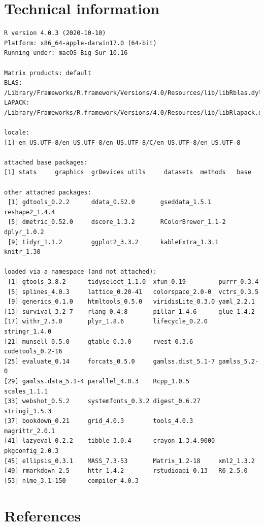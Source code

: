 \documentclass[
]{book}
\begin{document}
\hypertarget{ap:technical}{%
\chapter{Technical information}\label{ap:technical}}

\begin{verbatim}
R version 4.0.3 (2020-10-10)
Platform: x86_64-apple-darwin17.0 (64-bit)
Running under: macOS Big Sur 10.16

Matrix products: default
BLAS:   /Library/Frameworks/R.framework/Versions/4.0/Resources/lib/libRblas.dylib
LAPACK: /Library/Frameworks/R.framework/Versions/4.0/Resources/lib/libRlapack.dylib

locale:
[1] en_US.UTF-8/en_US.UTF-8/en_US.UTF-8/C/en_US.UTF-8/en_US.UTF-8

attached base packages:
[1] stats     graphics  grDevices utils     datasets  methods   base     

other attached packages:
 [1] gdtools_0.2.2      ddata_0.52.0       gseddata_1.5.1     reshape2_1.4.4    
 [5] dmetric_0.52.0     dscore_1.3.2       RColorBrewer_1.1-2 dplyr_1.0.2       
 [9] tidyr_1.1.2        ggplot2_3.3.2      kableExtra_1.3.1   knitr_1.30        

loaded via a namespace (and not attached):
 [1] gtools_3.8.2      tidyselect_1.1.0  xfun_0.19         purrr_0.3.4      
 [5] splines_4.0.3     lattice_0.20-41   colorspace_2.0-0  vctrs_0.3.5      
 [9] generics_0.1.0    htmltools_0.5.0   viridisLite_0.3.0 yaml_2.2.1       
[13] survival_3.2-7    rlang_0.4.8       pillar_1.4.6      glue_1.4.2       
[17] withr_2.3.0       plyr_1.8.6        lifecycle_0.2.0   stringr_1.4.0    
[21] munsell_0.5.0     gtable_0.3.0      rvest_0.3.6       codetools_0.2-16 
[25] evaluate_0.14     forcats_0.5.0     gamlss.dist_5.1-7 gamlss_5.2-0     
[29] gamlss.data_5.1-4 parallel_4.0.3    Rcpp_1.0.5        scales_1.1.1     
[33] webshot_0.5.2     systemfonts_0.3.2 digest_0.6.27     stringi_1.5.3    
[37] bookdown_0.21     grid_4.0.3        tools_4.0.3       magrittr_2.0.1   
[41] lazyeval_0.2.2    tibble_3.0.4      crayon_1.3.4.9000 pkgconfig_2.0.3  
[45] ellipsis_0.3.1    MASS_7.3-53       Matrix_1.2-18     xml2_1.3.2       
[49] rmarkdown_2.5     httr_1.4.2        rstudioapi_0.13   R6_2.5.0         
[53] nlme_3.1-150      compiler_4.0.3   
\end{verbatim}

\hypertarget{references}{%
\chapter*{References}\label{references}}
\end{document}
